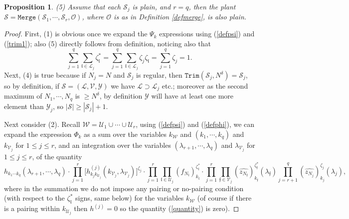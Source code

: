 \documentclass[11 pt,reqno]{amsart}
\newtheorem{prop}[thm]{Proposition}
\theoremstyle{definition}
\theoremstyle{remark}
\numberwithin{equation}{section}
\newcommand{\Sc}{\mathcal{S}}
\newcommand{\Lc}{\mathcal{L}}
\newcommand{\Uc}{\mathcal{U}}
\newcommand{\Vc}{\mathcal{V}}
\newcommand{\Wc}{\mathcal{W}}
\newcommand{\Yc}{\mathcal{Y}}
\newcommand{\ff}{\mathfrak{f}}
\newcommand{\lf}{\mathfrak{l}}
\newcommand{\Os}{\mathscr{O}}
\begin{document}
{\begin{prop}
 (5) Assume that each $\Sc_j$ is plain, and $r=q$, then the plant $\Sc=\mathtt{Merge}(\Sc_1,\cdots,\Sc_r,\Os)$, where $\Os$ is as in Definition \ref{defmerge}, is also plain.
 \end{prop}
 \begin{proof} First, (1) is obvious once we expand the $\Psi_k$ expressions using (\ref{defpsi}) and (\ref{trim1}); also (5) directly follows from definition, noticing also that\[\sum_{j=1}^q\sum_{\lf\in\Lc_j}\zeta_\lf^*=\sum_{j=1}^q\sum_{\lf\in\Lc_j}\zeta_j\zeta_\lf=\sum_{j=1}^q\zeta_j=1.\] Next, (4) is true because if $N_j=N$ and $\Sc_j$ is regular, then $\mathtt{Trim}(\Sc_j,N^\delta)=\Sc_j$, so by definition, if $\Sc=(\Lc,\Vc,\Yc)$ we have $\Lc\supset\Lc_j$ etc.; moreover as the second maximum of $N_1,\cdots,N_q$ is $\geq N^\delta$, by definition $\Yc$ will have at least one more element than $\Yc_j$, so $|\Sc|\geq |\Sc_j|+1$.
 
 Next consider (2). Recall $\Wc=\Uc_1\cup\cdots\cup\Uc_r$, using (\ref{defpsi}) and (\ref{defphi}), we can expand the expression $\Phi_k$ as a sum over the variables $k_{\Wc}$ and $(k_1,\cdots,k_q)$ and $k_{\Vc_j}$ for $1\leq j\leq r$, and an integration over the variables $(\lambda_{r+1},\cdots,\lambda_q)$ and $\lambda_{\Vc_j}$ for $1\leq j\leq r$, of the quantity
 \begin{equation}\label{quantity}h_{k_1\cdots k_q}(\lambda_{r+1},\cdots,\lambda_q)\cdot\prod_{j=1}^r \big[h_{k_jk_{\Uc_j}}^{(j)}(k_{\Vc_j},\lambda_{\Vc_j})\big]^{\zeta_j}\cdot\prod_{j=1}^r\prod_{\lf\in\Uc_j}(f_{N_\lf})_{k_\lf}^{\zeta_\lf^*}\cdot \prod_{j=1}^r\prod_{\ff\in\Vc_j}(\widehat{z_{N_\ff}})_{k_\ff}^{\zeta_\ff^*}(\lambda_\ff)\prod_{j=r+1}^q(\widehat{z_{N_j}})_{k_j}^{\zeta_j}(\lambda_j),
 \end{equation} where in the summation we do not impose any pairing or no-pairing condition (with respect to the $\zeta_\lf^*$ signs, same below) for the variables $k_{\Wc}$ (of course if there is a pairing within $k_{\Uc_j}$ then $h^{(j)}=0$ so the quantity (\ref{quantity}) is zero).
 

\end{proof}}
\end{document}
